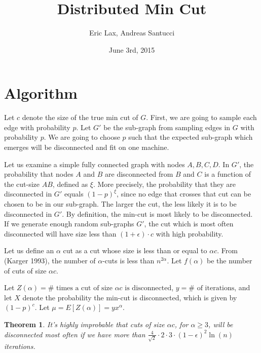\documentclass[12pt]{article}
\newtheorem{theorem}{Theorem}
\begin{document}
 

\title{\textbf{Distributed Min Cut}}
\author{Eric Lax, Andreas Santucci}
\date{June 3rd, 2015}
\maketitle

\section*{Algorithm}

Let $c$ denote the size of the true min cut of $G$. First, we are going to sample each edge with probability $p$. Let $G'$ be the sub-graph from sampling edges in $G$ with probability $p$. We are going to choose $p$ such that the expected sub-graph which emerges will be disconnected and fit on one machine. 

Let us examine a simple fully connected graph with nodes $A, B, C, D$.  In $G'$, the probability that nodes $A$ and $B$ are disconnected from $B$ and $C$ is a function of the cut-size $AB$, defined as $\xi$. More precisely, the probability that they are disconnected in $G'$ equals $(1-p)^\xi$, since no edge that crosses that cut can be chosen to be in our sub-graph. The larger the cut, the less likely it is to be disconnected in $G'$. By definition, the min-cut is most likely to be disconnected. If we generate enough random sub-graphs $G'$, the cut which is most often disconnected will have size less than $(1+\epsilon) \cdot c$ with high probability.

Let us define an $\alpha$ cut as a cut whose size is less than or equal to $\alpha c$. From (Karger 1993), the number of $\alpha$-cuts is less than $n^{2 \alpha}$. Let $f(\alpha)$ be the number of cuts of size $\alpha c$.

Let $Z(\alpha) = \# \text{ times a cut of size } \alpha c \text{ is disconnected}$, $y = \# \text{ of iterations}$, and let $X$ denote the probability the min-cut is disconnected, which is given by $(1 - p)^c$. Let $\mu = E[Z(\alpha)] = yx^\alpha$.

\begin{theorem} It's highly improbable that cuts of size $\alpha c$, for $\alpha \geq 3$, will be disconnected most often if we have more than $\frac{4}{\sqrt{2}} \cdot 2 \cdot 3 \cdot (1-\epsilon)^2 \ln{(n)}$ iterations.
\end{theorem}
\end{document}
